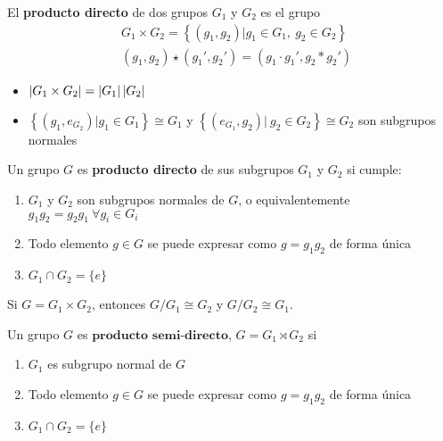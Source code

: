 \begin{definicion}
El \textbf{producto directo} de dos grupos $G_1$ y $G_2$ es el grupo
\begin{subequations}
\begin{flalign}
& G_1\times G_2= \left\{(g_1,g_2)|g_1\in G_1,\ g_2\in G_2\right\}\\
& (g_1,g_2)\star (g_1',g_2')= (g_1\cdot g_1', g_2\ast g_2')
\end{flalign}
\end{subequations}

\begin{itemize}
\item $\left\lvert G_1\times G_2\right\rvert=\left\lvert G_1\right\rvert\left\lvert G_2\right\rvert$
\item $\left\{(g_1,e_{G_2})|g_1\in G_1\right\}\cong G_1$ y $\left\{(e_{G_1},g_2)|\ g_2\in G_2\right\} \cong G_2$ son subgrupos normales
\end{itemize}
\end{definicion}

\begin{teorema} \label{producto_directo_teorema}
Un grupo $G$ es \textbf{producto directo} de sus subgrupos $G_1$ y $G_2$ si cumple:
\begin{enumerate}[label=\roman*)]
\item $G_1$ y $G_2$ son subgrupos normales de $G$, o equivalentemente $g_1g_2=g_2g_1\ \forall g_i\in G_i$
\item Todo elemento $g\in G$ se puede expresar como $g=g_1g_2$ de forma única
\item $G_1\cap G_2=\{e\}$
\end{enumerate}
\end{teorema}

\begin{corolario}
Si $G=G_1\times G_2$, entonces $G/G_1\cong G_2$ y $G/G_2\cong G_1$.
\end{corolario}

\begin{definicion}
Un grupo $G$ es $\textbf{producto semi-directo}$, $G=G_1\rtimes G_2$ si %

\begin{enumerate}[label=\roman*)]
\item $G_1$ es subgrupo normal de $G$
\item Todo elemento $g\in G$ se puede expresar como $g=g_1g_2$ de forma única
\item $G_1\cap G_2=\{e\}$
\end{enumerate}

\end{definicion}